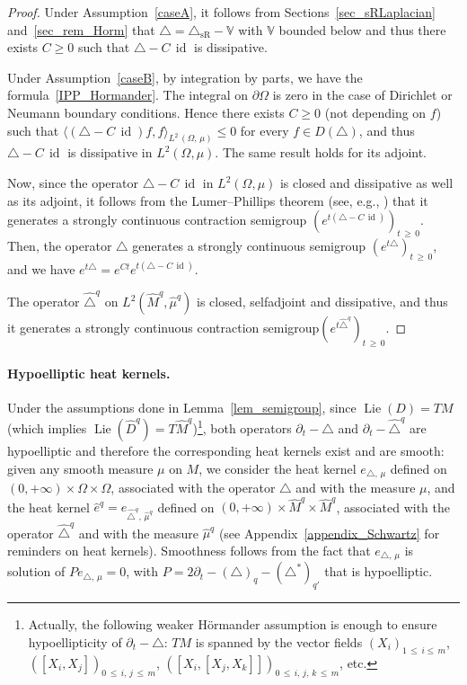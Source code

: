 \documentclass[AHL,Unicode,published]{cedram}
\newcommand{\bbV}{\mathbb{V}}
\DeclareMathOperator{\Lie}{Lie}
\DeclareMathOperator{\id}{id}
\newcommand{\trianglesR}{\triangle_{\mathrm{sR}}}
\renewcommand{\geq}{\geqslant}
\renewcommand{\leq}{\leqslant}
\begin{document}
\begin{proof}
Under Assumption~\ref{caseA}, it follows from Sections~\ref{sec_sRLaplacian} and~\ref{sec_rem_Horm} that $\triangle = \trianglesR - \bbV$ with $\bbV$ bounded below and thus there exists $C\geq 0$ such that $\triangle-C\,\id$ is dissipative.

Under Assumption~\ref{caseB}, by integration by parts, we have the formula~\eqref{IPP_Hormander}. The integral on $\partial\Omega$ is zero in the case of Dirichlet or Neumann boundary conditions. Hence there exists $C\geq 0$ (not depending on $f$) such that $\langle(\triangle-C\,\id) f,f\rangle_{L^2\,(\Omega,\,\mu)}\leq 0$ for every $f\in D(\triangle)$, and thus $\triangle-C\,\id$ is dissipative in $L^2(\Omega,\mu)$. The same result holds for its adjoint.

Now, since the operator $\triangle-C\,\id$ in $L^2(\Omega,\mu)$ is closed and dissipative as well as its adjoint, it follows from the Lumer--Phillips theorem (see, e.g., \cite{EngelNagel,Pazy}) that it generates a strongly continuous contraction semigroup $(e^{t(\triangle-C\,\id)})_{t\,\geq\,0}$. Then, the operator $\triangle$ generates a strongly continuous semigroup $(e^{t\triangle})_{t\,\geq\,0}$, and we have $e^{t\triangle} = e^{C t} e^{t(\triangle-C\,\id)}$.

The operator $\widehat{\triangle}^{q}$ on $L^2(\widehat M^{q},\widehat\mu^{q})$ is closed, selfadjoint and dissipative, and thus it generates a strongly continuous contraction semigroup$ (e^{t\widehat{\triangle}^{q}})_{t\,\geq\,0}$.
\end{proof}

\paragraph{Hypoelliptic heat kernels.}
Under the assumptions done in Lemma~\ref{lem_semigroup}, since $\Lie(D)=TM$ (which implies $\Lie(\widehat D^{q})=T\widehat M^{q}$)\footnote{Actually, the following weaker H\"ormander assumption is enough to ensure hypoellipticity of $\partial_t-\triangle$: $TM$ is spanned by the vector fields $(X_i)_{1\,\leq\,i\leq\,m}$, $([X_i,X_j])_{0\,\leq\,i,\,j\,\leq\,m}$, $([X_i,[X_j,X_k]])_{0\,\leq\,i,\,j,\,k\,\leq\,m}$, etc.}, both operators $\partial_t-\triangle$ and $\partial_t-\widehat\triangle^{q}$ are hypoelliptic and therefore the corresponding heat kernels exist and are smooth: given any smooth measure $\mu$ on $M$, we consider the heat kernel $e_{\triangle,\,\mu}$ defined on $(0,+\infty)\times\Omega\times\Omega$, associated with the operator $\triangle$ and with the measure $\mu$, and the heat kernel $\widehat{e}^{q} = e_{\widehat{\triangle}^{q},\,\widehat{\mu}^{q}}$ defined on $(0,+\infty)\times\widehat{M}^{q}\times\widehat{M}^{q}$, associated with the operator $\widehat{\triangle}^{q}$ and with the measure $\widehat{\mu}^{q}$ (see Appendix~\ref{appendix_Schwartz} for reminders on heat kernels). Smoothness follows from the fact that $e_{\triangle,\,\mu}$ is solution of $Pe_{\triangle,\,\mu}=0$, with $P=2\partial_t-(\triangle)_q-(\triangle^*)_{q'}$ that is hypoelliptic.
\end{document}
